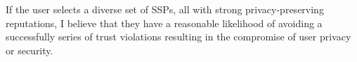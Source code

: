 If the user selects a diverse set of SSPs, all with strong
privacy-preserving reputations, I believe that they have a reasonable
likelihood of avoiding a successfully series of trust violations
resulting in the compromise of user privacy or security.

